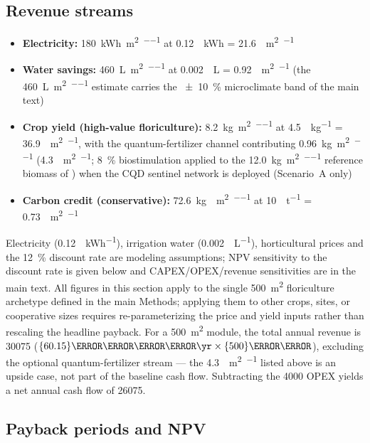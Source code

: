 \documentclass[11pt,a4paper]{article}
\begin{document}
\subsection{Revenue streams}

\begin{itemize}
\item \textbf{Electricity:} \qty{180}{\kWh\per\m\squared\per\yr} at \qty{0.12}{\per\kWh} = \qty{21.6}{\per\m\squared\per\yr}
\item \textbf{Water savings:} \qty{460}{\L\per\m\squared\per\yr} at \qty{0.002}{\per\L} = \qty{0.92}{\per\m\squared\per\yr} (the \qty{460}{\L\per\m\squared\per\yr} estimate carries the \qty{\pm 10}{\percent} microclimate band of the main text)
\item \textbf{Crop yield (high-value floriculture):} \qty{8.2}{\kg\per\m\squared\per\yr} at \qty{4.5}{\USD\per\kg} = \qty{36.9}{\per\m\squared\per\yr}, with the quantum-fertilizer channel contributing \qty{0.96}{\kg\per\m\squared\per\yr} (\qty{4.3}{\per\m\squared\per\yr}; \qty{8}{\percent} biostimulation applied to the \qty{12.0}{\kg\per\m\squared\per\yr} reference biomass of ) when the CQD sentinel network is deployed (Scenario~A only)
\item \textbf{Carbon credit (conservative):} \qty{72.6}{\kg{}\per\m\squared\per\yr} at \qty{10}{\USD\per\tonne} = \qty{0.73}{\per\m\squared\per\yr}
\end{itemize}
Electricity (\qty{0.12}{\USD\per\kWh}), irrigation water (\qty{0.002}{\USD\per\L}), horticultural prices and the \qty{12}{\percent} discount rate are modeling assumptions; NPV sensitivity to the discount rate is given below and CAPEX/OPEX/revenue sensitivities are in the main text. All figures in this section apply to the single \qty{500}{\m\squared} floriculture archetype defined in the main Methods; applying them to other crops, sites, or cooperative sizes requires re-parameterizing the price and yield inputs rather than rescaling the headline payback.
For a \qty{500}{\m\squared} module, the total annual revenue is \qty{30075}{\USD} ($\qty{60.15}{\per\m\squared\per\yr} \times \qty{500}{\m\squared}$), excluding the optional quantum-fertilizer stream --- the \qty{4.3}{\per\m\squared\per\yr} listed above is an upside case, not part of the baseline cash flow. Subtracting the \qty{4000}{\USD} OPEX yields a net annual cash flow of \qty{26075}{\USD}.

\subsection{Payback periods and NPV}
\end{document}
